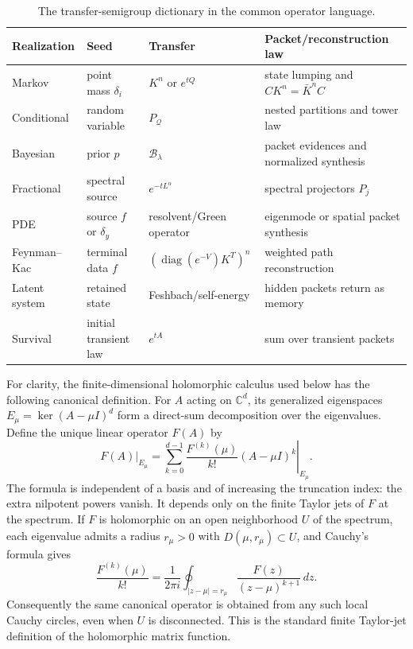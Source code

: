 \documentclass[11pt,a4paper]{article}
\theoremstyle{definition}
\theoremstyle{remark}
\newcommand{\cB}{\mathcal B}
\newcommand{\diag}{\operatorname{diag}}
\begin{document}
\begin{table}[htbp]
\centering
\small
\begin{tabularx}{\textwidth}{L{0.17\textwidth} L{0.19\textwidth} Y Y}
\toprule
Realization & Seed & Transfer & Packet/reconstruction law\\
\midrule
Markov & point mass $\delta_i$ & $K^n$ or $e^{tQ}$ & state lumping and $CK^n=\bar K^nC$\\
Conditional & random variable & $P_{\mathcal Q}$ & nested partitions and tower law\\
Bayesian & prior $p$ & $\cB_\lambda$ & packet evidences and normalized synthesis\\
Fractional & spectral source & $e^{-tL^\alpha}$ & spectral projectors $P_j$\\
PDE & source $f$ or $\delta_y$ & resolvent/Green operator & eigenmode or spatial packet synthesis\\
Feynman--Kac & terminal data $f$ & $(\diag(e^{-V})K^T)^n$ & weighted path reconstruction\\
Latent system & retained state & Feshbach/self-energy & hidden packets return as memory\\
Survival & initial transient law & $e^{tA}$ & sum over transient packets\\
\bottomrule
\end{tabularx}
\caption{The transfer-semigroup dictionary in the common operator language.}
\label{core:tab:dictionary}
\end{table}

For clarity, the finite-dimensional holomorphic calculus used below has the
following canonical definition. For $A$ acting on $\mathbb C^d$, its generalized
eigenspaces $E_\mu=\ker(A-\mu I)^d$ form a direct-sum decomposition over the
eigenvalues. Define the unique linear operator $F(A)$ by
\[
\left.F(A)\right|_{E_\mu}
=\left.\sum_{k=0}^{d-1}\frac{F^{(k)}(\mu)}{k!}(A-\mu I)^k\right|_{E_\mu}.
\]
The formula is independent of a basis and of increasing the truncation index:
the extra nilpotent powers vanish. It depends only on the finite Taylor jets of
$F$ at the spectrum. If $F$ is holomorphic on an open neighborhood $U$ of the
spectrum, each eigenvalue admits a radius $r_\mu>0$ with
$\overline{D(\mu,r_\mu)}\subset U$, and Cauchy's formula gives
\[
\frac{F^{(k)}(\mu)}{k!}
=\frac{1}{2\pi i}\oint_{|z-\mu|=r_\mu}
  \frac{F(z)}{(z-\mu)^{k+1}}\,dz.
\]
Consequently the same canonical operator is obtained from any such local
Cauchy circles, even when $U$ is disconnected. This is the standard finite
Taylor-jet definition of the holomorphic matrix function.
\end{document}
